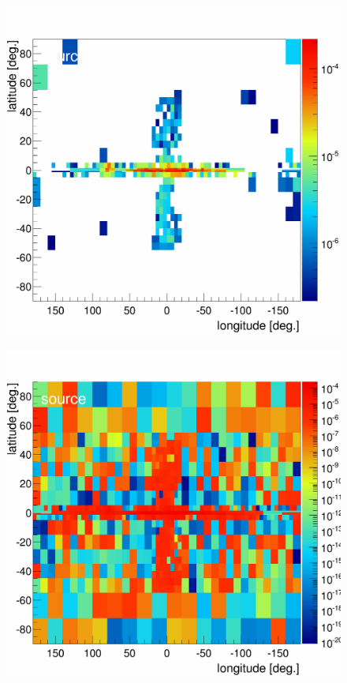 \begin{figure}[h]
  \centering
  \begin{minipage}[h]{0.3\textwidth}
  	\centering
	\includegraphics[width=1.\linewidth]{pic/discussion/MCRonly_SCR_integral_flux.png}
  	\label{}
  \end{minipage}
  \hfill
  \begin{minipage}[h]{0.3\textwidth}
	  \centering
	  \includegraphics[width=1.\linewidth]{pic/discussion/DMonly_SCR_integral_flux.png}

\end{minipage}
\end{figure}
